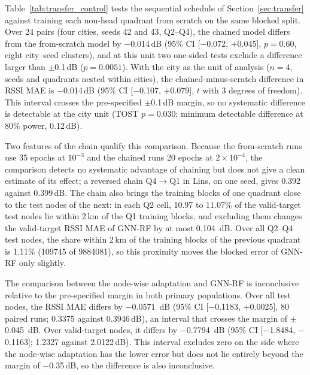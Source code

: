 \documentclass{ieeeaccess}
\begin{document}
Table~\ref{tab:transfer_control} tests the sequential schedule of Section~\ref{sec:transfer} against training each non-head quadrant from scratch on the same blocked split. Over 24 pairs (four cities, seeds 42 and 43, Q2--Q4), the chained model differs from the from-scratch model by $-$0.014\,dB (95\% CI [$-$0.072, $+$0.045], $p{=}0.60$, eight city--seed clusters), and at this unit two one-sided tests exclude a difference larger than $\pm$0.1\,dB ($p{=}0.0051$). With the city as the unit of analysis ($n{=}4$, seeds and quadrants nested within cities), the chained-minus-scratch difference in RSSI MAE is $-$0.014\,dB (95\% CI [$-$0.107, $+$0.079], $t$ with 3 degrees of freedom). This interval crosses the pre-specified $\pm$0.1\,dB margin, so no systematic difference is detectable at the city unit (TOST $p{=}0.030$; minimum detectable difference at 80\% power, 0.12\,dB).

Two features of the chain qualify this comparison. Because the from-scratch runs use 35 epochs at $10^{-3}$ and the chained runs 20 epochs at $2\times10^{-4}$, the comparison detects no systematic advantage of chaining but does not give a clean estimate of its effect; a reversed chain Q4$\to$Q1 in Lins, on one seed, gives 0.392 against 0.399\,dB. The chain also brings the training blocks of one quadrant close to the test nodes of the next: in each Q2 cell, 10.97 to 11.07\% of the valid-target test nodes lie within 2\,km of the Q1 training blocks, and excluding them changes the valid-target RSSI MAE of GNN-RF by at most \SI{0.104}{\deci\bel}. Over all Q2--Q4 test nodes, the share within 2\,km of the training blocks of the previous quadrant is 1.11\% (\num{109745} of \num{9884081}), so this proximity moves the blocked error of GNN-RF only slightly.



The comparison between the node-wise adaptation and GNN-RF is inconclusive relative to the pre-specified margin in both primary populations. Over all test nodes, the RSSI MAE differs by \SI{-0.0571}{\deci\bel} (95\% CI [$-$0.1183, $+$0.0025], 80 paired runs; 0.3375 against 0.3946\,dB), an interval that crosses the margin of $\pm$\SI{0.045}{\deci\bel}. Over valid-target nodes, it differs by \SI{-0.7794}{\deci\bel} (95\% CI [$-$1.8484, $-$0.1163]; 1.2327 against 2.0122\,dB). This interval excludes zero on the side where the node-wise adaptation has the lower error but does not lie entirely beyond the margin of $-$0.35\,dB, so the difference is also inconclusive.
\end{document}
